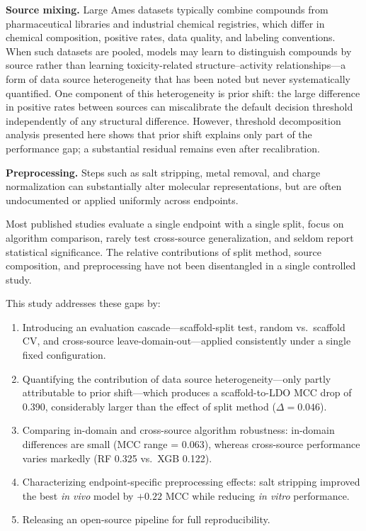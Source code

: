 \documentclass[journal=jacsat,manuscript=article]{achemso}
\begin{document}
\textbf{Source mixing.} Large Ames datasets typically combine compounds from pharmaceutical
libraries and industrial chemical registries,\cite{Hansen_2009,Honma_2019} which differ in
chemical composition, positive rates, data quality, and labeling conventions. When such
datasets are pooled, models may learn to distinguish compounds by source rather than
learning toxicity-related structure--activity relationships---a form of data source
heterogeneity that has been noted\cite{Tropsha_2010,Hanser_2016} but never systematically
quantified. One component of
this heterogeneity is prior shift: the large difference in positive rates between sources
can miscalibrate the default decision threshold independently of any structural difference.
However, threshold decomposition analysis presented here shows that prior shift explains
only part of the performance gap; a substantial residual remains even after recalibration.

\textbf{Preprocessing.} Steps such as salt stripping, metal removal, and charge
normalization can substantially alter molecular
representations,\cite{Fourches_2010,Fourches_2016} but are often undocumented or applied
uniformly across endpoints.

Most published studies evaluate a single endpoint with a single split, focus on algorithm
comparison,\cite{Yang_2019,Mayr_2016} rarely test cross-source generalization, and seldom
report statistical significance.\cite{Demsar_2006} The relative contributions of split
method, source composition, and preprocessing have not been disentangled in a single
controlled study.

This study addresses these gaps by:
\begin{enumerate}
    \item Introducing an evaluation cascade---scaffold-split test, random vs.\ scaffold CV,
    and cross-source leave-domain-out---applied consistently under a single fixed
    configuration.

    \item Quantifying the contribution of data source heterogeneity---only partly
    attributable to prior shift---which produces a scaffold-to-LDO MCC drop of 0.390,
    considerably larger than the effect of split method
    ($\Delta = 0.046$).

    \item Comparing in-domain and cross-source algorithm robustness: in-domain differences
    are small (MCC range = 0.063), whereas cross-source performance varies markedly
    (RF 0.325 vs.\ XGB 0.122).

    \item Characterizing endpoint-specific preprocessing effects: salt stripping improved
    the best \textit{in vivo} model by $+0.22$ MCC while reducing \textit{in vitro} performance.

    \item Releasing an open-source pipeline for full reproducibility.
\end{enumerate}
\end{document}
